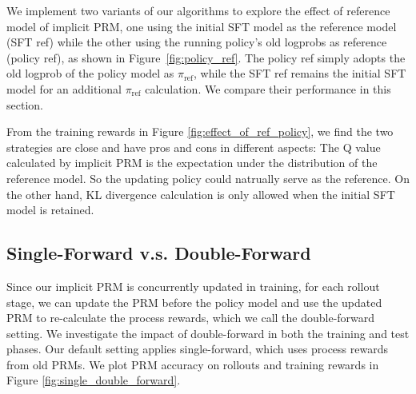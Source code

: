 



We implement two variants of our algorithms to explore the effect of reference model of implicit PRM, one using the initial SFT model as the reference model (SFT ref) while the other using the running policy's old logprobs as reference (policy ref), as shown in Figure~\ref{fig:policy_ref}. The policy ref simply adopts the old logprob of the policy model as  $\pi_{\text{ref}}$, while the SFT ref remains the initial SFT model for an additional $\pi_{\text{ref}}$ calculation. We compare their performance in this section. 

From the training rewards in Figure \ref{fig:effect_of_ref_policy}, we find the two strategies are close and have pros and cons in different aspects: The Q value calculated by implicit PRM is the expectation under the distribution of the reference model. So the updating policy could natrually serve as the reference.
On the other hand, KL divergence calculation is only allowed when the initial SFT model is retained.




\subsection{Single-Forward v.s. Double-Forward}
Since our implicit PRM is concurrently updated in training, for each rollout stage, we can update the PRM before the policy model and use the updated PRM to re-calculate the process rewards, which we call the double-forward setting. We investigate the impact of double-forward in both the training and test phases. Our default setting applies single-forward, which uses process rewards from old PRMs. We plot PRM accuracy on rollouts and training rewards in Figure \ref{fig:single_double_forward}.


